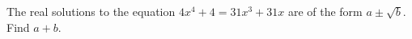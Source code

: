 The real solutions to the equation $4x^4 + 4 = 31x^3 + 31x$ are of the form $a \pm \sqrt{b}$. Find $a + b$.
